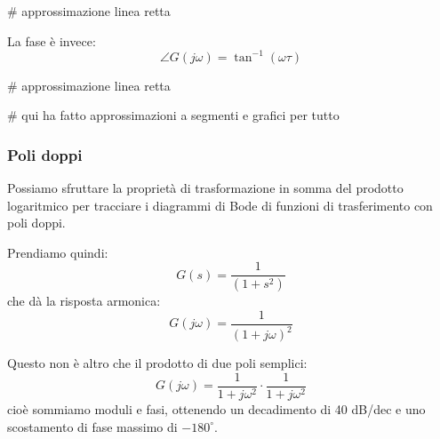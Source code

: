 \documentclass[a4paper,11pt]{article}
\begin{document}
# approssimazione linea retta

La fase è invece:
$$
\angle G(j \omega) = \tan^{-1} (\omega \tau)
$$

# approssimazione linea retta

# qui ha fatto approssimazioni a segmenti e grafici per tutto

\subsubsection{Poli doppi}
Possiamo sfruttare la proprietà di trasformazione in somma del prodotto logaritmico per tracciare i diagrammi di Bode di funzioni di trasferimento con poli doppi.

Prendiamo quindi:
$$
G(s) = \frac{1}{(1 + s^2)}
$$
che dà la risposta armonica:
$$
G(j \omega) = \frac{1}{(1 + j \omega)^2}
$$

Questo non è altro che il prodotto di due poli semplici:
$$
G(j \omega) = \frac{1}{1 + j \omega^2} \cdot \frac{1}{1 + j \omega^2}
$$
cioè sommiamo moduli e fasi, ottenendo un decadimento di 40 dB/dec e uno scostamento di fase massimo di $-180^\circ$.
\end{document}
